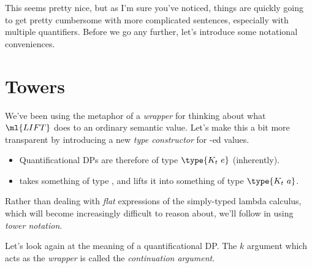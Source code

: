 \documentclass[nols,twoside,nofonts,nobib,nohyper]{tufte-handout}
\begin{document}
           This seems pretty nice, but as I'm sure you've noticed, things are
           quickly going to get pretty cumbersome with more complicated
           sentences, especially with multiple quantifiers. Before we go any
           further, let's introduce some notational conveniences.

\section{Towers}

We've been using the metaphor of a \textit{wrapper} for thinking about what
$\ml{LIFT}$ does to an ordinary semantic value. Let's make this a bit more
transparent by introducing a new \textit{type constructor} for -ed
values.

\ex
{}
\xe


\begin{itemize}

\item Quantificational DPs are therefore of type $\type{{K}_{t} e}$ (inherently).

\item {} takes something of type , and lifts it into
    something of type $\type{K_{t} a}$.

\end{itemize}

Rather than dealing with \textit{flat} expressions of the simply-typed lambda
calculus, which will become increasingly difficult to reason about, we'll follow
\cite{barkerShan2015} in using \textit{tower notation}.

Let's look again at the meaning of a quantificational DP. The $k$ argument which
acts as the \textit{wrapper} is called the \textit{continuation argument}.
\end{document}
